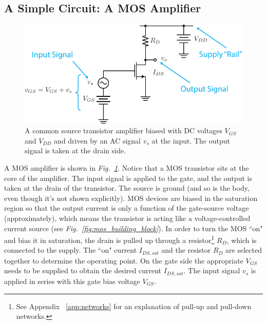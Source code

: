 \subsection{A Simple Circuit: A MOS Amplifier}
\begin{figure}[tb]
\centering
\includegraphics[width=.75\columnwidth]{csamp_signals}
\caption{A common source transistor amplifier biased with DC voltages $V_{GS}$ and $V_{DD}$ and driven by an AC signal $v_s$ at the input.  The output signal is taken at the drain side.}
\label{fig:csamp_signals}
\end{figure}
A MOS amplifier is shown in \emph{Fig.~\ref{fig:csamp_signals}}.  Notice that a MOS transistor sits at the core of the amplifier.  The input signal is applied to the gate, and the output is taken at the drain of the transistor.  The source is ground (and so is the body, even though it's not shown explicitly).  MOS devices are biased in the saturation region so that the output current is only a function of the gate-source voltage (approximately), which means the transistor is acting like a voltage-controlled current source (see \emph{Fig.~\ref{fig:mos_building_block}}).  In order to turn the MOS ``on" and bias it in saturation, the drain is pulled up through a resistor\footnote{See Appendix ~\ref{app:networks} for an explanation of pull-up and pull-down networks.} $R_D$, which is connected to the supply.  The ``on" current $I_{DS,sat}$ and the resistor $R_D$ are selected together to determine the operating point.  On the gate side the appropriate $V_{GS}$ needs to be supplied to obtain the desired current $I_{DS,sat}$.  The input signal $v_{s}$ is applied in series with this gate bias voltage $V_{GS}$.
